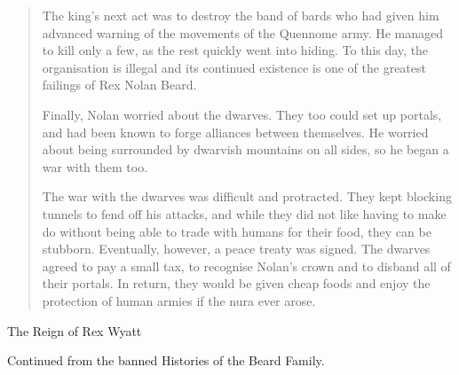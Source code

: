 \begin{quotation}
	The king's next act was to destroy the band of bards who had given him advanced warning of the movements of the Quennome army.  He managed to kill only a few, as the rest quickly went into hiding.  To this day, the organisation is illegal and its continued existence is one of the greatest failings of Rex Nolan Beard.

	Finally, Nolan worried about the dwarves.  They too could set up portals, and had been known to forge alliances between themselves.  He worried about being surrounded by dwarvish mountains on all sides, so he began a war with them too.

	The war with the dwarves was difficult and protracted.  They kept blocking tunnels to fend off his attacks, and while they did not like having to make do without being able to trade with humans for their food, they can be stubborn.  Eventually, however,  a peace treaty was signed.  The dwarves agreed to pay a small tax, to recognise Nolan's crown and to disband all of their portals.  In return, they would be given cheap foods and enjoy the protection of human armies if the nura ever arose.

\end{quotation}

The Reign of Rex Wyatt

Continued from the banned Histories of the Beard Family.


